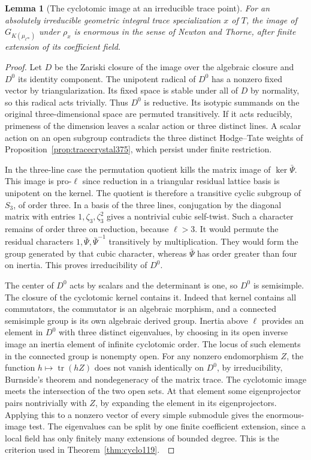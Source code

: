 \documentclass[a4paper,11pt]{article}
\newtheorem{lemma}[proposition]{Lemma}
\theoremstyle{definition}
\theoremstyle{remark}
\numberwithin{equation}{section}
\begin{document}
\begin{lemma}[The cyclotomic image at an irreducible trace point]
\label{lem:cyclointegral377}
For an absolutely irreducible geometric integral trace
specialization \(x\) of \(T\), the image of
\(G_{K(\mu_{\ell^\infty})}\) under \(\rho_x\) is enormous
in the sense of Newton and Thorne, after finite extension
of its coefficient field.
\end{lemma}
\begin{proof}
Let \(D\) be the Zariski closure of the image over the
algebraic closure and \(D^0\) its identity component.
The unipotent radical of \(D^0\) has a nonzero fixed vector
by triangularization. Its fixed space is stable under all of
\(D\) by normality, so this radical acts trivially. Thus
\(D^0\) is reductive. Its isotypic summands on the original
three-dimensional space are permuted transitively. If it
acts reducibly, primeness of the dimension leaves a scalar
action or three distinct lines. A scalar action on an open
subgroup contradicts the three distinct Hodge--Tate weights
of Proposition~\ref{prop:tracecrystal375}, which persist
under finite restriction.

In the three-line case the permutation quotient kills the
matrix image of \(\ker\bar\Psi\). This image is pro-\(\ell\)
since reduction in a triangular residual lattice basis is
unipotent on the kernel. The quotient is therefore a
transitive cyclic subgroup of \(S_3\), of order three.
In a basis of the three lines, conjugation by the diagonal
matrix with entries \(1,\zeta_3,\zeta_3^2\) gives a nontrivial
cubic self-twist. Such a character remains of order three
on reduction, because \(\ell>3\). It would permute the
residual characters \(1,\bar\Psi,\bar\Psi^{-1}\) transitively
by multiplication. They would form the group generated by
that cubic character, whereas \(\bar\Psi\) has order greater
than four on inertia. This proves irreducibility of \(D^0\).

The center of \(D^0\) acts by scalars and the determinant is
one, so \(D^0\) is semisimple. The closure of the cyclotomic
kernel contains it. Indeed that kernel contains all commutators,
the commutator is an algebraic morphism, and a connected
semisimple group is its own algebraic derived group.
Inertia above \(\ell\) provides an element in \(D^0\) with
three distinct eigenvalues, by choosing in its open inverse
image an inertia element of infinite cyclotomic order.
The locus of such elements in the connected group is
nonempty open. For any nonzero endomorphism \(Z\), the
function \(h\mapsto\operatorname{tr}(hZ)\) does not vanish
identically on \(D^0\), by irreducibility, Burnside's theorem
and nondegeneracy of the matrix trace. The cyclotomic image
meets the intersection of the two open sets. At that element
some eigenprojector pairs nontrivially with \(Z\), by
expanding the element in its eigenprojectors. Applying this
to a nonzero vector of every simple submodule gives the
enormous-image test. The eigenvalues can be split by one
finite coefficient extension, since a local field has only
finitely many extensions of bounded degree. This is the
criterion used in Theorem~\ref{thm:cyclo119}.~\cite{VIII-VI-VI-nt119}
\end{proof}
\end{document}
